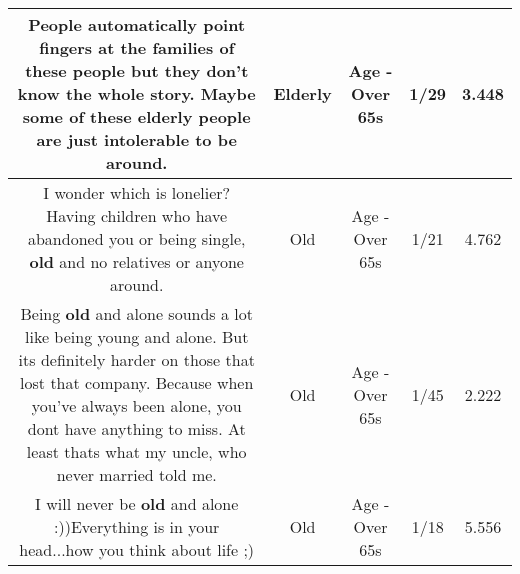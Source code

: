 \documentclass[11pt]{article}
\newlength\mylength
\begin{document}
\begin{center}
\begin{longtable}{|C{.65\mylength}|C{.30\mylength}|C{.12\mylength}|C{.12\mylength}|C{.12\mylength}|}
  \small People automatically point fingers at the families of these people but they don't know the whole story. Maybe some of these \textbf{elderly} people are just intolerable to be around.\normalsize   & Elderly & Age - Over 65s & 1/29 & 3.448 \\  \hline
  \small I wonder which is lonelier? Having children who have abandoned you or being single, \textbf{old} and no relatives or anyone around.\normalsize   & Old & Age - Over 65s & 1/21 & 4.762 \\  \hline
  \small Being \textbf{old} and alone sounds a lot like being young and alone. But its definitely harder on those that lost that company. Because when you've always been alone, you dont have anything to miss. At least thats what my uncle, who never married told me.\normalsize   & Old & Age - Over 65s & 1/45 & 2.222 \\  \hline
  \small I will never be \textbf{old} and alone :))Everything is in your head...how you think about life ;)\normalsize   & Old & Age - Over 65s & 1/18 & 5.556 \\  \hline

\end{longtable}
\end{center}
\end{document}
